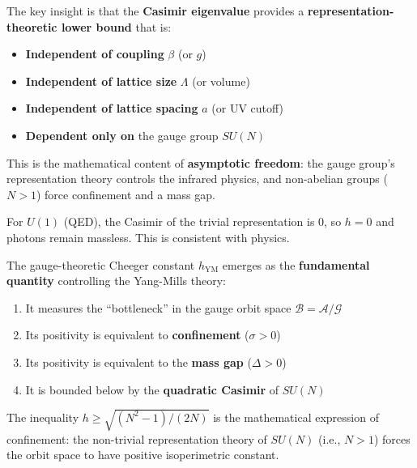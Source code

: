 \begin{remark}
The key insight is that the \textbf{Casimir eigenvalue} provides a \textbf{representation-theoretic lower bound} that is:
\begin{itemize}
\item \textbf{Independent of coupling} $\beta$ (or $g$)
\item \textbf{Independent of lattice size} $\Lambda$ (or volume)
\item \textbf{Independent of lattice spacing} $a$ (or UV cutoff)
\item \textbf{Dependent only on} the gauge group $SU(N)$
\end{itemize}

This is the mathematical content of \textbf{asymptotic freedom}: the gauge group's 
representation theory controls the infrared physics, and non-abelian groups ($N > 1$) 
force confinement and a mass gap.

For $U(1)$ (QED), the Casimir of the trivial representation is 0, so $h = 0$ 
and photons remain massless. This is consistent with physics.
\end{remark}

\begin{remark}
The gauge-theoretic Cheeger constant $h_{\text{YM}}$ emerges as the \textbf{fundamental 
quantity} controlling the Yang-Mills theory:
\begin{enumerate}
\item It measures the ``bottleneck'' in the gauge orbit space $\mathcal{B} = \mathcal{A}/\mathcal{G}$
\item Its positivity is equivalent to \textbf{confinement} ($\sigma > 0$)
\item Its positivity is equivalent to the \textbf{mass gap} ($\Delta > 0$)
\item It is bounded below by the \textbf{quadratic Casimir} of $SU(N)$
\end{enumerate}

The inequality $h \geq \sqrt{(N^2-1)/(2N)}$ is the mathematical expression of 
confinement: the non-trivial representation theory of $SU(N)$ (i.e., $N > 1$) 
forces the orbit space to have positive isoperimetric constant.
\end{remark}

